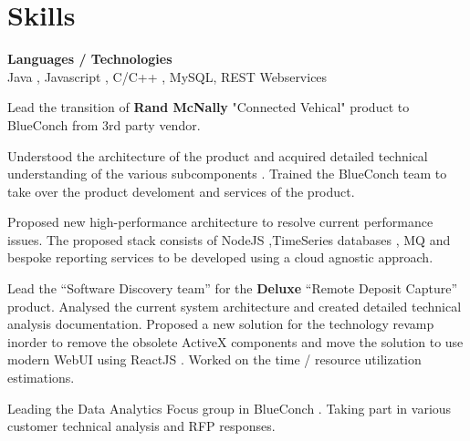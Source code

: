 \documentclass[a4,10pt]{cv4tw}
\begin{document}
\section{Skills}
\begin{skills}{}
\end{skills}

{\textbf{Languages / Technologies} \\Java , Javascript , C/C++ , MySQL, REST Webservices}
	{
	\begin{missions}
      \item Lead the transition of \textbf{Rand McNally} "Connected Vehical" product to BlueConch from 3rd party vendor.
      \item Understood the architecture of the product and acquired detailed technical understanding of the various subcomponents . Trained the BlueConch team to take over the product develoment and services of the product.
      \item Proposed new high-performance architecture to resolve current  performance issues. The proposed stack consists of NodeJS ,TimeSeries databases ,  MQ and bespoke reporting services to be developed  using a cloud agnostic approach.
      \vskip 4mm
      \item Lead the \enquote{Software Discovery team} for the \textbf{Deluxe} \enquote{Remote Deposit Capture} product. Analysed the current system architecture and created detailed technical analysis documentation. Proposed a new solution for the technology revamp inorder to  remove the obsolete ActiveX components and move the solution to use modern WebUI using ReactJS . Worked on the time / resource utilization estimations.
      \vskip 4mm
      \item Leading the Data Analytics Focus group in BlueConch . Taking part in various customer technical analysis and RFP responses.
	\end{missions}
}
\end{document}
